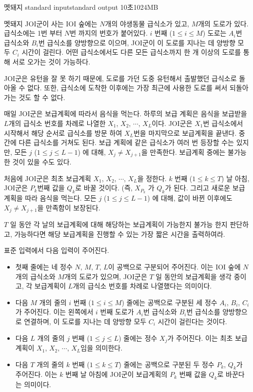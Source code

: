 \begin{problem}{멧돼지}
	{standard input}{standard output}
	{10초}{1024MB}{}
	
	멧돼지 JOI군이 사는 IOI 숲에는 $N$개의 야생동물 급식소가 있고, $M$개의 도로가 있다. 급식소에는 1번 부터 $N$번 까지의 번호가 붙어있다. $i$ 번째 ($1 \le i \le M$) 도로는 $A_i$번 급식소와 $B_i$번 급식소를 양방향으로 이으며, JOI군이 이 도로를 지나는 데 양방향 모두 $C_i$ 시간이 걸린다. 어떤 급식소에서도 다른 모든 급식소까지 한 개 이상의 도로를 통해 서로 오가는 것이 가능하다.
	
	JOI군은 유턴을 잘 못 하기 때문에, 도로를 가던 도중 유턴해서 출발했던 급식소로 돌아올 수 없다. 또한, 급식소에 도착한 이후에는 가장 최근에 사용한 도로를 써서 되돌아가는 것도 할 수 없다.
	
	매일 JOI군은 보급계획에 따라서 음식을 먹는다. 하루의 보급 계획은 음식을 보급받을 $L$개의 급식소 번호를 차례로 나열한 $X_1$, $X_2$, $\cdots$, $X_L$이다. JOI군은 $X_1$번 급식소에서 시작해서 해당 순서로 급식소를 방문 하여 $X_L$번을 마지막으로 보급계획을 끝낸다. 중간에 다른 급식소를 거쳐도 된다. 보급 계획에 같은 급식소가 여러 번 등장할 수는 있지만, 모든 $j$ ($1 \le j \le L-1$) 에 대해, $X_j \ne X_{j+1}$을 만족한다. 보급계획 중에는 불가능 한 것이 있을 수도 있다.
	
	처음에 JOI군은 최초 보급계획 $X_1$, $X_2$, $\cdots$, $X_L$을 정한다. $k$ 번째 ($1 \le k \le T$) 날 아침, JOI군은 $P_k$번째 값을 $Q_k$로 바꿀 것이다. (즉, $X_{P_k}$ 가 $Q_k$가 된다. 그리고 새로운 보급계획을 따라 음식을 먹는다. 모든 $j$ ($1 \le j \le L-1$) 에 대해, 값이 바뀐 이후에도 $X_j \ne X_{j+1}$을 만족함이 보장된다.
	
	$T$ 일 동안 각 날의 보급계획에 대해 해당하는 보급계획이 가능한지 불가능 한지 판단하고, 가능하다면 해당 보급계획을 진행할 수 있는 가장 짧은 시간을 출력하여라.
	
	\InputFile
	
	표준 입력에서 다음 입력이 주어진다.
	
	\begin{itemize}
		\item 첫째 줄에는 네 정수 $N$, $M$, $T$, $L$이 공백으로 구분되어 주어진다. 이는 IOI 숲에 $N$개의 급식소와 $M$개의 도로가 있으며, JOI군은 $T$ 일 동안의 보급계획을 생각 중이고, 각 보급계획이 $L$개의 급식소 번호를 차례로 나열했다는 의미이다.
		\item 다음 $M$ 개의 줄의 $i$ 번째 ($1 \le i \le M$) 줄에는 공백으로 구분된 세 정수 $A_i$, $B_i$, $C_i$가 주어진다. 이는 왼쪽에서 $i$ 번째 도로가 $A_i$번 급식소와 $B_i$번 급식소를 양방향으로 연결하며, 이 도로를 지나는 데 양방향 모두 $C_i$ 시간이 걸린다는 것이다.
		\item 다음 $L$ 개의 줄의 $j$ 번째 ($1 \le j \le L$) 줄에는 정수 $X_j$가 주어진다. 이는 최초 보급계획이 $X_1$, $X_2$, $\cdots$, $X_L$임을 의미한다.
		\item 다음 $T$ 개의 줄의 $k$ 번째 ($1 \le k \le T$) 줄에는 공백으로 구분된 두 정수 $P_k$, $Q_k$가 주어진다. 이는 $k$ 번째 날 아침에 JOI군이 보급계획의 $P_k$ 번째 값을 $Q_k$로 바꾼다는 의미이다.
	\end{itemize}
	

\end{problem}
